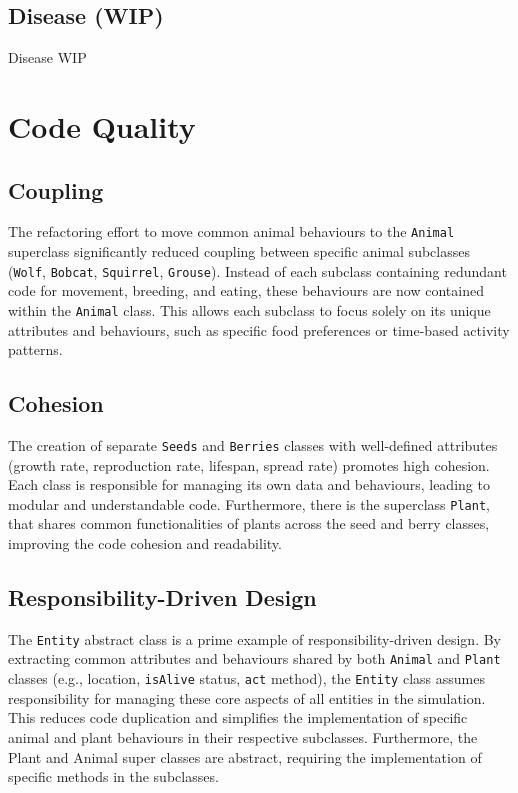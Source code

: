 \documentclass{article}
\begin{document}
\subsection{Disease (WIP)}
Disease WIP

\section{Code Quality}

\subsection{Coupling}

The refactoring effort to move common animal behaviours to the \texttt{Animal} superclass significantly reduced coupling between specific animal subclasses (\texttt{Wolf}, \texttt{Bobcat}, \texttt{Squirrel}, \texttt{Grouse}). Instead of each subclass containing redundant code for movement, breeding, and eating, these behaviours are now contained within the \texttt{Animal} class. This allows each subclass to focus solely on its unique attributes and behaviours, such as specific food preferences or time-based activity patterns.

\subsection{Cohesion}

The creation of separate \texttt{Seeds} and \texttt{Berries} classes with well-defined attributes (growth rate, reproduction rate, lifespan, spread rate) promotes high cohesion. Each class is responsible for managing its own data and behaviours, leading to modular and understandable code. Furthermore, there is the superclass \texttt{Plant}, that shares common functionalities of plants across the seed and berry classes, improving the code cohesion and readability.

\subsection{Responsibility-Driven Design}

The \texttt{Entity} abstract class is a prime example of responsibility-driven design. By extracting common attributes and behaviours shared by both \texttt{Animal} and \texttt{Plant} classes (e.g., location, \texttt{isAlive} status, \texttt{act} method), the \texttt{Entity} class assumes responsibility for managing these core aspects of all entities in the simulation. This reduces code duplication and simplifies the implementation of specific animal and plant behaviours in their respective subclasses. Furthermore, the Plant and Animal super classes are abstract, requiring the implementation of specific methods in the subclasses.
\end{document}
